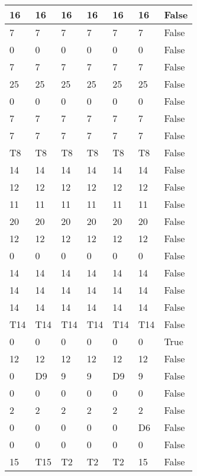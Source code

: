 \begin{longtable}[htbp]{| p{} | p{} | p{}| p{}| p{}| p{}| p{}|}
16 & 16 & 16 & 16 & 16 & 16 & False \\ \hline
7 & 7 & 7 & 7 & 7 & 7 & False \\ \hline
0 & 0 & 0 & 0 & 0 & 0 & False \\ \hline
7 & 7 & 7 & 7 & 7 & 7 & False \\ \hline
25 & 25 & 25 & 25 & 25 & 25 & False \\ \hline
0 & 0 & 0 & 0 & 0 & 0 & False \\ \hline
7 & 7 & 7 & 7 & 7 & 7 & False \\ \hline
7 & 7 & 7 & 7 & 7 & 7 & False \\ \hline
\multicolumn{1}{|l|}{T8} & \multicolumn{1}{l|}{T8} & \multicolumn{1}{l|}{T8} & \multicolumn{1}{l|}{T8} & \multicolumn{1}{l|}{T8} & \multicolumn{1}{l|}{T8} & False \\ \hline
14 & 14 & 14 & 14 & 14 & 14 & False \\ \hline
12 & 12 & 12 & 12 & 12 & 12 & False \\ \hline
11 & 11 & 11 & 11 & 11 & 11 & False \\ \hline
20 & 20 & 20 & 20 & 20 & 20 & False \\ \hline
12 & 12 & 12 & 12 & 12 & 12 & False \\ \hline
0 & 0 & 0 & 0 & 0 & 0 & False \\ \hline
14 & 14 & 14 & 14 & 14 & 14 & False \\ \hline
14 & 14 & 14 & 14 & 14 & 14 & False \\ \hline
14 & 14 & 14 & 14 & 14 & 14 & False \\ \hline
\multicolumn{1}{|l|}{T14} & \multicolumn{1}{l|}{T14} & \multicolumn{1}{l|}{T14} & \multicolumn{1}{l|}{T14} & \multicolumn{1}{l|}{T14} & \multicolumn{1}{l|}{T14} & False \\ \hline
0 & 0 & 0 & 0 & 0 & 0 & True \\ \hline
12 & 12 & 12 & 12 & 12 & 12 & False \\ \hline
0 & \multicolumn{1}{l|}{D9} & 9 & 9 & \multicolumn{1}{l|}{D9} & 9 & False \\ \hline
0 & 0 & 0 & 0 & 0 & 0 & False \\ \hline
2 & 2 & 2 & 2 & 2 & 2 & False \\ \hline
0 & 0 & 0 & 0 & 0 & \multicolumn{1}{l|}{D6} & False \\ \hline
0 & 0 & 0 & 0 & 0 & 0 & False \\ \hline
15 & \multicolumn{1}{l|}{T15} & \multicolumn{1}{l|}{T2} & \multicolumn{1}{l|}{T2} & \multicolumn{1}{l|}{T2} & 15 & False \\ \hline

\end{longtable}
